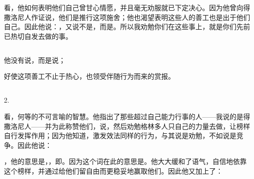 \par

看，他如何表明他们自己曾甘心情愿，并且毫无劝服就已下定决心。因为他曾向得撒洛尼人作证说，他们是推行这项施舍；他也渴望表明这些人的善工也是出于他们自己。因此他说：，又说不是，而是。所以我劝勉你们在这些事上，就是你们先前已热切自发去做的事。\par


\subsection{}

\par

他没有说，而是说；\par

\par

好使这项善工不止于热心，也领受伴随行为而来的赏报。\par


\subsection{}

2. \par

看，何等的不可言喻的智慧。他指出了那些超过自己能力行事的人——我说的是得撒洛尼人——并为此称赞他们，说，然后劝勉格林多人只自己的力量去做，让榜样自行发挥作用；因为他知道，激发效法同样的行为，与其说是劝勉，不如说是竞争。因此他说：\par

，他的意思是，，即。因为这个词在此的意思是。他大大缓和了语气，自信地依靠这个榜样，并通过给他们留自由而更稳妥地赢取他们。因此他又加上了：\par

